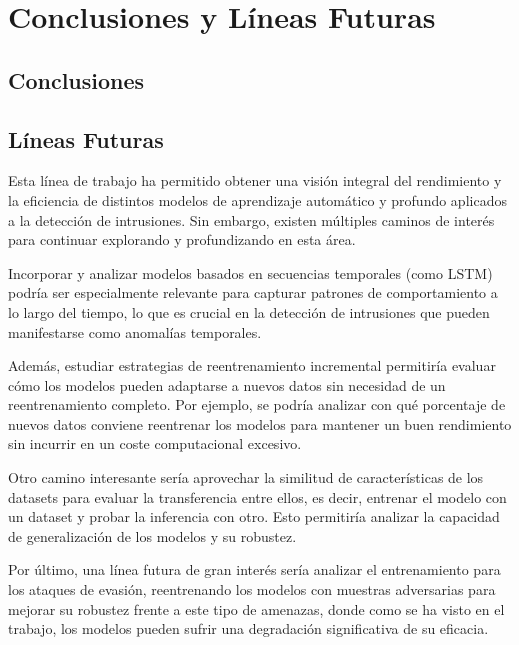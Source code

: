 \chapter{Conclusiones y Líneas Futuras}

\section{Conclusiones}

\section{Líneas Futuras}

Esta línea de trabajo ha permitido obtener una visión integral del rendimiento y la eficiencia de distintos modelos de aprendizaje automático y profundo aplicados a la detección de intrusiones. Sin embargo, existen múltiples caminos de interés para continuar explorando y profundizando en esta área.

Incorporar y analizar modelos basados en secuencias temporales (como LSTM) podría ser especialmente relevante para capturar patrones de comportamiento a lo largo del tiempo, lo que es crucial en la detección de intrusiones que pueden manifestarse como anomalías temporales. 

Además, estudiar estrategias de reentrenamiento incremental permitiría evaluar cómo los modelos pueden adaptarse a nuevos datos sin necesidad de un reentrenamiento completo. Por ejemplo, se podría analizar con qué porcentaje de nuevos datos conviene reentrenar los modelos para mantener un buen rendimiento sin incurrir en un coste computacional excesivo.

Otro camino interesante sería aprovechar la similitud de características de los datasets para evaluar la transferencia entre ellos, es decir, entrenar el modelo con un dataset y probar la inferencia con otro. Esto permitiría analizar la capacidad de generalización de los modelos y su robustez.

Por último, una línea futura de gran interés sería analizar el entrenamiento para los ataques de evasión, reentrenando los modelos con muestras adversarias para mejorar su robustez frente a este tipo de amenazas, donde como se ha visto en el trabajo, los modelos pueden sufrir una degradación significativa de su eficacia.